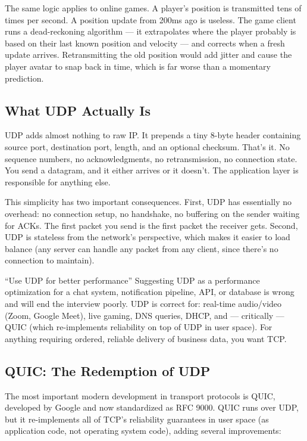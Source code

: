 \documentclass[11pt,a4paper]{article}
\begin{document}
The same logic applies to online games. A player's position is transmitted tens of times per second. A position update from 200ms ago is useless. The game client runs a dead-reckoning algorithm --- it extrapolates where the player probably is based on their last known position and velocity --- and corrects when a fresh update arrives. Retransmitting the old position would add jitter and cause the player avatar to snap back in time, which is far worse than a momentary prediction.

\subsection{What UDP Actually Is}

UDP adds almost nothing to raw IP. It prepends a tiny 8-byte header containing source port, destination port, length, and an optional checksum. That's it. No sequence numbers, no acknowledgments, no retransmission, no connection state. You send a datagram, and it either arrives or it doesn't. The application layer is responsible for anything else.

This simplicity has two important consequences. First, UDP has essentially no overhead: no connection setup, no handshake, no buffering on the sender waiting for ACKs. The first packet you send is the first packet the receiver gets. Second, UDP is stateless from the network's perspective, which makes it easier to load balance (any server can handle any packet from any client, since there's no connection to maintain).

\begin{trapbox}{``Use UDP for better performance''}
Suggesting UDP as a performance optimization for a chat system, notification pipeline, API, or database is wrong and will end the interview poorly. UDP is correct for: real-time audio/video (Zoom, Google Meet), live gaming, DNS queries, DHCP, and --- critically --- QUIC (which re-implements reliability on top of UDP in user space). For anything requiring ordered, reliable delivery of business data, you want TCP.
\end{trapbox}

\subsection{QUIC: The Redemption of UDP}

The most important modern development in transport protocols is QUIC, developed by Google and now standardized as RFC 9000. QUIC runs over UDP, but it re-implements all of TCP's reliability guarantees in user space (as application code, not operating system code), adding several improvements:
\end{document}

